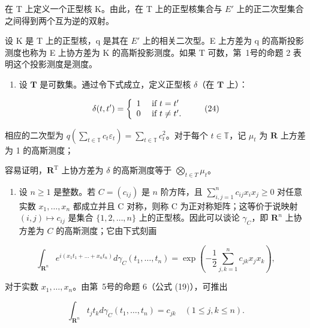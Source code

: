 在 T 上定义一个正型核 K。由此，在 T 上的正型核集合与 \(E'\) 上的正二次型集合之间得到两个互为逆的双射。

设 K 是 T 上的正型核，q 是其在 \(E'\) 上的相关二次型。E 上方差为 q 的高斯投影测度也称为 E 上协方差为 K 的高斯投影测度。如果 T 可数，第~1号的命题 2 表明这个投影测度是测度。

\begin{enumerate}
\def\labelenumi{\arabic{enumi})}
\setcounter{enumi}{2}
\tightlist
\item
  设 \(\mathbf{T}\) 是可数集。通过令下式成立，定义正型核 \(\delta\)（在 \(\mathbf{T}\) 上）：
\end{enumerate}

\[
\delta (t, t ^ {\prime}) = \left\{ \begin{array}{l l} 1 & \text { if } t = t ^ {\prime} \\ 0 & \text { if } t \neq t ^ {\prime}. \end{array} \right.\tag{24}
\]

相应的二次型为 \(q\left(\sum_{t \in \mathbb{T}} c_t \varepsilon_t\right) = \sum_{t \in \mathbb{T}} c_t^2\)。对于每个 \(t \in \mathbb{T}\)，记 \(\mu_t\) 为 \(\mathbf{R}\) 上方差为 1 的高斯测度；

容易证明，\(\mathbf{R}^{\mathrm{T}}\) 上协方差为 \(\delta\) 的高斯测度等于 \(\bigotimes_{t\in T}\mu_t\)。

\begin{enumerate}
\def\labelenumi{\arabic{enumi})}
\setcounter{enumi}{3}
\tightlist
\item
  设 \(n \geqslant 1\) 是整数。若 \(C = (c_{ij})\) 是 \(n\) 阶方阵，且 \(\sum_{i,j=1}^{n} c_{ij} x_i x_j \geqslant 0\) 对任意实数 \(x_1, \ldots, x_n\) 都成立并且 C 对称，则称 C 为正对称矩阵；这等价于说映射 \((i,j) \mapsto c_{ij}\) 是集合 \(\{1,2,\ldots,n\}\) 上的正型核。因此可以谈论 \(\gamma_C\)，即 \(\mathbf{R}^n\) 上协方差为 \(C\) 的高斯测度；它由下式刻画
\end{enumerate}

\[
\int_ {\mathbf {R} ^ {n}} e ^ {i (x _ {1} t _ {1} + \dots + x _ {n} t _ {n})} d \gamma_ {C} (t _ {1}, \dots , t _ {n}) = \exp \left(- \frac {1}{2} \sum_ {j, k = 1} ^ {n} c _ {j k} x _ {j} x _ {k}\right),\tag{25}
\]

对于实数 \(x_{1}, \ldots, x_{n}\)。由第~5号的命题 6（公式 (19)），可推出

\[
\int_ {\mathbf {R} ^ {n}} t _ {j} t _ {k} d \gamma_ {C} (t _ {1}, \dots , t _ {n}) = c _ {j k} \quad (1 \leqslant j, k \leqslant n).\tag{26}
\]

